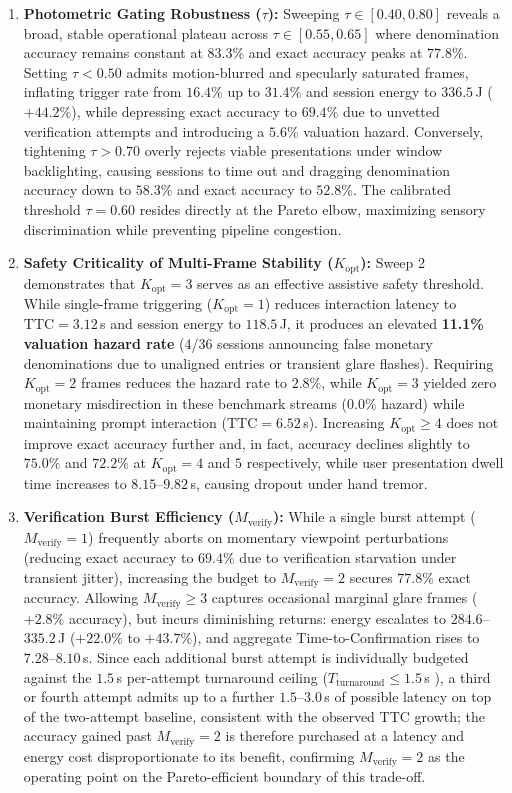 \documentclass[final,5p,times,twocolumn,authoryear]{elsarticle}
\begin{document}
\begin{enumerate}[label=(\roman*)]
    \item \textbf{Photometric Gating Robustness ($\tau$):} Sweeping $\tau \in [0.40, 0.80]$ reveals a broad, stable operational plateau across $\tau \in [0.55, 0.65]$ where denomination accuracy remains constant at $83.3\%$ and exact accuracy peaks at $77.8\%$. Setting $\tau < 0.50$ admits motion-blurred and specularly saturated frames, inflating trigger rate from $16.4\%$ up to $31.4\%$ and session energy to $336.5$\,J ($+44.2\%$), while depressing exact accuracy to $69.4\%$ due to unvetted verification attempts and introducing a $5.6\%$ valuation hazard. Conversely, tightening $\tau > 0.70$ overly rejects viable presentations under window backlighting, causing sessions to time out and dragging denomination accuracy down to $58.3\%$ and exact accuracy to $52.8\%$. The calibrated threshold $\tau = 0.60$ resides directly at the Pareto elbow, maximizing sensory discrimination while preventing pipeline congestion.
    \item \textbf{Safety Criticality of Multi-Frame Stability ($K_{\text{opt}}$):} Sweep 2 demonstrates that $K_{\text{opt}} = 3$ serves as an effective assistive safety threshold. While single-frame triggering ($K_{\text{opt}} = 1$) reduces interaction latency to $\text{TTC} = 3.12$\,s and session energy to $118.5$\,J, it produces an elevated \textbf{11.1\% valuation hazard rate} (4/36 sessions announcing false monetary denominations due to unaligned entries or transient glare flashes). Requiring $K_{\text{opt}} = 2$ frames reduces the hazard rate to $2.8\%$, while $K_{\text{opt}} = 3$ yielded zero monetary misdirection in these benchmark streams ($0.0\%$ hazard) while maintaining prompt interaction ($\text{TTC} = 6.52$\,s). Increasing $K_{\text{opt}} \ge 4$ does not improve exact accuracy further and, in fact, accuracy declines slightly to $75.0\%$ and $72.2\%$ at $K_{\text{opt}} = 4$ and $5$ respectively, while user presentation dwell time increases to $8.15$--$9.82$\,s, causing dropout under hand tremor.
    \item \textbf{Verification Burst Efficiency ($M_{\text{verify}}$):} While a single burst attempt ($M_{\text{verify}} = 1$) frequently aborts on momentary viewpoint perturbations (reducing exact accuracy to $69.4\%$ due to verification starvation under transient jitter), increasing the budget to $M_{\text{verify}} = 2$ secures $77.8\%$ exact accuracy. Allowing $M_{\text{verify}} \ge 3$ captures occasional marginal glare frames ($+2.8\%$ accuracy), but incurs diminishing returns: energy escalates to $284.6$--$335.2$\,J ($+22.0\%$ to $+43.7\%$), and aggregate Time-to-Confirmation rises to $7.28$--$8.10$\,s. Since each additional burst attempt is individually budgeted against the $1.5$\,s per-attempt turnaround ceiling ($T_{\text{turnaround}} \le 1.5$\,s \cite{Nielsen1993}), a third or fourth attempt admits up to a further $1.5$--$3.0$\,s of possible latency on top of the two-attempt baseline, consistent with the observed TTC growth; the accuracy gained past $M_{\text{verify}} = 2$ is therefore purchased at a latency and energy cost disproportionate to its benefit, confirming $M_{\text{verify}} = 2$ as the operating point on the Pareto-efficient boundary of this trade-off.

\end{enumerate}
\end{document}
